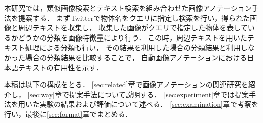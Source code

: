本研究では，類似画像検索とテキスト検索を組み合わせた画像アノテーション手法を提案する．
まずTwitterで物体名をクエリに指定し検索を行い，得られた画像と周辺テキストを収集し，
収集した画像がクエリで指定した物体を表しているかどうかの分類を画像特徴量により行う．
この時，周辺テキストを用いたテキスト処理による分類も行い，
その結果を利用した場合の分類結果と利用しなかった場合の分類結果を比較することで，
自動画像アノテーションにおける日本語テキストの有用性を示す．

本稿は以下の構成をとる．
\ref{sec:related}章で画像アノテーションの関連研究を紹介し，
\ref{sec:way}章で提案手法について説明する．
\ref{sec:experiment}章では提案手法を用いた実験の結果および評価について述べる．
\ref{sec:examination}章で考察を行い，最後に\ref{sec:format}章でまとめる．